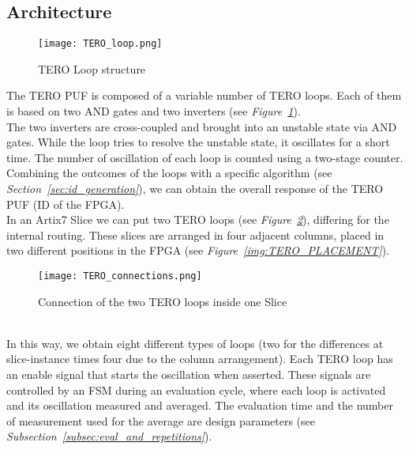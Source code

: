 \subsection{Architecture}
\begin{figure}
    \centering
    \texttt{[image: TERO\_loop.png]}
    \caption{TERO Loop structure}
    \label{img:TERO_LOOP}
\end{figure}
The TERO PUF is composed of a variable number of TERO loops. Each of them is based on
two AND gates and two inverters (see \textit{Figure~\ref{img:TERO_LOOP}}). \\
The two inverters are cross-coupled and brought into an unstable state via AND gates. 
While the loop tries to resolve the unstable state, it oscillates for a short time.
The number of oscillation of each loop is counted using a two-stage counter.
Combining the outcomes of the loops with a specific algorithm (see \textit{Section~\ref{sec:id_generation}}),
we can obtain the overall response of the TERO PUF (ID of the FPGA). \\
In an Artix7 Slice we can put two TERO loops (see \textit{Figure~\ref{img:TERO_CONNECTIONS}}), differing for the internal routing.
These slices are arranged in four adjacent columns, placed in two different positions in the FPGA (see \textit{Figure~\ref{img:TERO_PLACEMENT}}).
\begin{figure}[h]
    \centering
    \texttt{[image: TERO\_connections.png]}
    \caption{Connection of the two TERO loops inside one Slice}
    \label{img:TERO_CONNECTIONS}
\end{figure} \\
In this way, we obtain eight different types of loops 
(two for the differences at slice-instance times four due to the column arrangement).
Each TERO loop has an enable signal that starts the oscillation when asserted. 
These signals are controlled by an FSM during an evaluation cycle, where each loop is activated and its oscillation measured and averaged.
The evaluation time and the number of measurement used for the average are design parameters (see \textit{Subsection~\ref{subsec:eval_and_repetitions}}).

